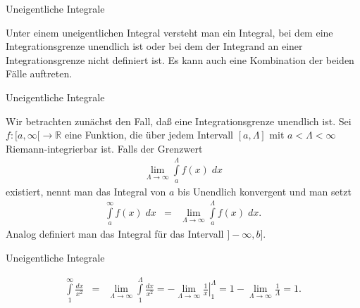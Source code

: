 \documentclass[german]{beamer}
\newcommand{\bq}{\begin{eqnarray*}}
\newcommand{\eq}{\end{eqnarray*}}
\begin{document}
\begin{frame}{Uneigentliche Integrale}

\begin{definition}
Unter einem uneigentlichen Integral versteht man ein Integral, bei dem eine Integrationsgrenze unendlich ist oder
bei dem der Integrand an einer Integrationsgrenze nicht definiert ist.
Es kann auch eine Kombination der beiden F\"alle auftreten.
\end{definition}

\end{frame}

\begin{frame}{Uneigentliche Integrale}

Wir betrachten zun\"achst den Fall, da{\ss} eine Integrationsgrenze unendlich ist.
Sei $f: [a,\infty[ \rightarrow \mathbb R$ eine Funktion, die \"uber jedem Intervall $[a,\Lambda]$ mit
$a<\Lambda <\infty$ Riemann-integrierbar ist. Falls der Grenzwert
\bq
 \lim\limits_{\Lambda \rightarrow \infty} \int\limits_a^\Lambda f(x) \; dx
\eq
existiert, nennt man das Integral von $a$  bis Unendlich konvergent und man setzt
\bq
 \int\limits_a^\infty f(x) \; dx
 & = &
 \lim\limits_{\Lambda \rightarrow \infty} \int\limits_a^\Lambda f(x) \; dx.
\eq
Analog definiert man das Integral f\"ur das Intervall $]-\infty,b]$.

\end{frame}

\begin{frame}{Uneigentliche Integrale}

\begin{example}
\bq
\int\limits_1^\infty \frac{dx}{x^2}
 & = & 
 \lim\limits_{\Lambda \rightarrow \infty} \int\limits_1^\Lambda \frac{dx}{x^2}
 =
 - \lim\limits_{\Lambda \rightarrow \infty} \left. \frac{1}{x} \right|^\Lambda_1
 = 
 1 - \lim\limits_{\Lambda \rightarrow \infty} \frac{1}{\Lambda}
 = 
 1.
\eq
\end{example}

\end{frame}
\end{document}
